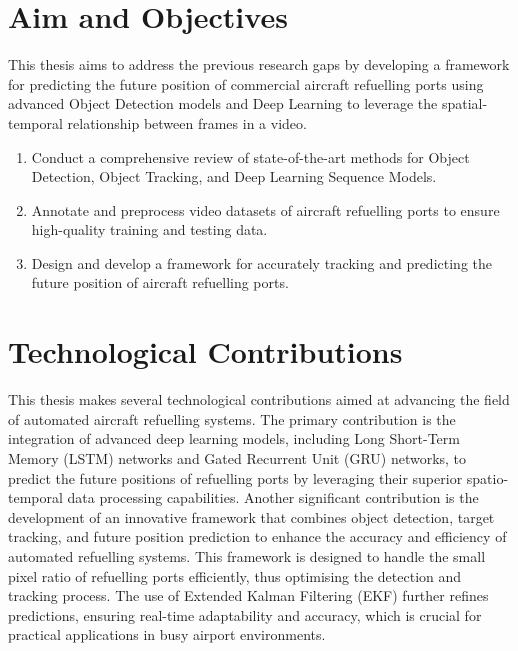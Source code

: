 \documentclass[12pt,oneside]{book} %
\begin{document}
\newpage

\section{Aim and Objectives}
This thesis aims to address the previous research gaps by developing a
framework for predicting the future position of commercial aircraft refuelling
ports using advanced Object Detection models and Deep Learning to leverage the
spatial-temporal relationship between frames in a video.
\begin{enumerate}
    \item Conduct a comprehensive review of state-of-the-art methods for Object
          Detection, Object Tracking, and Deep Learning Sequence Models.
    \item Annotate and preprocess video datasets of aircraft refuelling ports to ensure
          high-quality training and testing data.
    \item Design and develop a framework for accurately tracking and predicting the
          future position of aircraft refuelling ports.
\end{enumerate}

\section{Technological Contributions}
This thesis makes several technological contributions aimed at advancing the
field of automated aircraft refuelling systems. The primary contribution is the
integration of advanced deep learning models, including Long Short-Term Memory
(LSTM) networks and Gated Recurrent Unit (GRU) networks, to predict the future
positions of refuelling ports by leveraging their superior spatio-temporal data
processing capabilities. Another significant contribution is the development of
an innovative framework that combines object detection, target tracking, and
future position prediction to enhance the accuracy and efficiency of automated
refuelling systems. This framework is designed to handle the small pixel ratio
of refuelling ports efficiently, thus optimising the detection and tracking
process. The use of Extended Kalman Filtering (EKF) further refines
predictions, ensuring real-time adaptability and accuracy, which is crucial for
practical applications in busy airport environments. 
\end{document}
